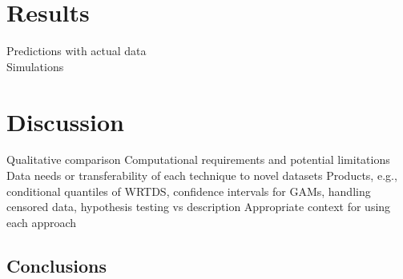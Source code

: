 \documentclass[letterpaper,12pt,oneside]{article}\usepackage[]{graphicx}\usepackage[]{color}
\begin{document}
\section{Results}

\begin{outline}
\0 \noindent Predictions with actual data \\
\0 \noindent Simulations
\end{outline} 

\section{Discussion}



\begin{outline}
\0 \noindent Qualitative comparison
\1 Computational requirements and potential limitations
\1 Data needs or transferability of each technique to novel datasets
\1 Products, e.g., conditional quantiles of \ac{WRTDS}, confidence intervals for \acp{GAM}, handling censored data, hypothesis testing vs description
\1 Appropriate context for using each approach
\end{outline}

\subsection{Conclusions}

\clearpage
\begin{singlespace}


\end{singlespace}
\clearpage

\end{document}
